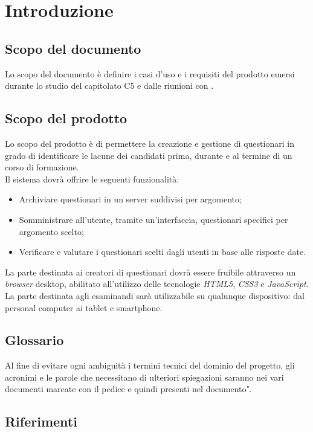 \newpage
\section{Introduzione}

\subsection{Scopo del documento}
Lo scopo del documento è definire i casi d'uso e i requisiti del prodotto emersi durante lo studio del capitolato C5 e dalle riunioni con \ZU.
\subsection{Scopo del prodotto}
Lo scopo del prodotto è di permettere la creazione e gestione di questionari in grado di identificare le lacune dei candidati prima, durante e al termine di un corso di formazione. 
\\Il sistema dovrà offrire le seguenti funzionalità:
\begin{itemize}
\item
Archiviare questionari in un server suddivisi per argomento;
\item
Somministrare all'utente, tramite un'interfaccia, questionari specifici per argomento scelto;
\item
Verificare e valutare i questionari scelti dagli utenti in base alle risposte date.
\end{itemize}
La parte destinata ai creatori di questionari dovrà essere fruibile attraverso un \textit{browser} desktop, abilitato all'utilizzo delle tecnologie \textit{HTML5}, \textit{CSS3} e \textit{JavaScript}. La parte destinata agli esaminandi sarà utilizzabile su qualunque dispositivo: dal personal computer ai tablet e smartphone.

\subsection{Glossario}
Al fine di evitare ogni ambiguità i termini tecnici del dominio del progetto, gli acronimi e le parole che necessitano di ulteriori spiegazioni saranno nei vari documenti marcate con il pedice  e quindi presenti nel documento \textit{\G}.

\subsection{Riferimenti}
